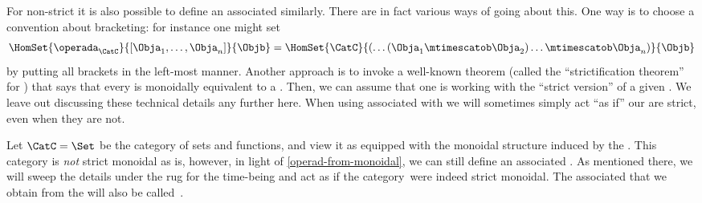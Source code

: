
\begin{remark}
    \label{operad-from-monoidal}
    For non-strict  it is also possible to define an associated  similarly.
    There are in fact various ways of going about this.
    One way is to choose a convention about bracketing: for instance one might set
    \begin{equation}
        \HomSet{\operada_\CatC}{[\Obja_1,\ldots,\Obja_n]}{\Objb}=\HomSet{\CatC}{ ( \dots (\Obja_1 \mtimescatob \Obja_2) \ldots \mtimescatob \Obja_n)}{\Objb}
    \end{equation}
    by putting all brackets in the left-most manner.
    Another approach is to invoke a well-known theorem (called the ``strictification theorem'' for ) that says that every  is monoidally equivalent to a .
    Then, we can assume that one is working with the ``strict version'' of a given .
    We leave out discussing these technical details any further here.
    When using  associated with  we will sometimes simply act ``as if'' our  are strict, even when they are not.
\end{remark}

\begin{example}
    Let $\CatC = \Set$ be the category of sets and functions, and view it as equipped with the monoidal structure induced by the .
    This category is \emph{not} strict monoidal as is, however, in light of \cref{operad-from-monoidal}, we can still define an associated .
    As mentioned there, we will sweep the details under the rug for the time-being and act as if the category~\Set were indeed strict monoidal.
    The associated  that we obtain from the  \Set will also be called~\Set.
\end{example}

